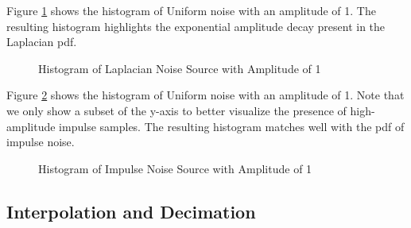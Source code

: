 \documentclass{article}
\begin{document}
Figure \ref{fig::laplacian_noise_histogram} shows the histogram of Uniform noise with an amplitude of 1. The resulting histogram highlights the exponential amplitude decay present in the Laplacian pdf.

\begin{figure}[H]
	\centerline{}
	\caption{Histogram of Laplacian Noise Source with Amplitude of 1}
	\label{fig::laplacian_noise_histogram}
\end{figure}

Figure \ref{fig::impulse_noise_histogram} shows the histogram of Uniform noise with an amplitude of 1. Note that we only show a subset of the y-axis to better visualize the presence of high-amplitude impulse samples. The resulting histogram matches well with the pdf of impulse noise.

\begin{figure}[H]
	\centerline{}
	\caption{Histogram of Impulse Noise Source with Amplitude of 1}
	\label{fig::impulse_noise_histogram}
\end{figure}

\subsection{Interpolation and Decimation}
\end{document}
